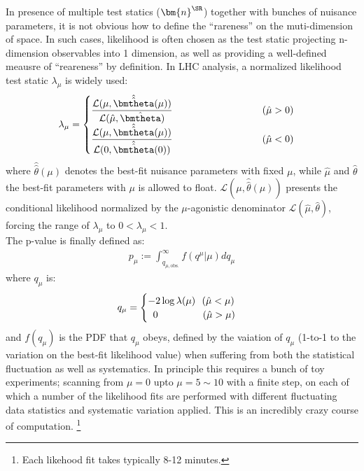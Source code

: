 In presence of multiple test statics ($\bm{n}^{\SR}$) together with bunches of nuisance parameters, it is not obvious how to define the ``rareness'' on the muti-dimension of space. In such cases, likelihood is often chosen as the test static projecting n-dimension observables into 1 dimension, as well as providing a well-defined meausre of ``reareness'' by definition. In LHC analysis, a normalized likelihood test static $\lambda_\mu$ is widely used:
\begin{align}
\lambda_\mu = 
        \begin{cases}
        \dfrac{ \mathcal{L} (\mu, \hat{\hat{\bmtheta}}(\mu)) }{ \mathcal{L} (\hat{\mu}, \hat{\bmtheta})  }         \mbox{\phantom{MMMMMMMMMM}} (\hat{\mu}>0)        \\
        \dfrac{ \mathcal{L} (\mu, \hat{\hat{\bmtheta}}(\mu)) }{ \mathcal{L} (0, \hat{\hat{\bmtheta}}(0))  }  \mbox{\phantom{MMMMMMMMMM}} (\hat{\mu}<0)
        \end{cases}
\end{align}
where $\hat{\hat{\theta}}(\mu)$ denotes the best-fit nuisance parameters with fixed $\mu$,
while $\hat{\mu}$ and $\hat{\theta}$ the best-fit parameters with $\mu$ is allowed to float. 
$\mathcal{L} (\mu, \hat{\hat{\theta}}(\mu))$ presents the conditional likelihood normalized by the $\mu$-agonistic denominator $\mathcal{L} (\hat{\mu}, \hat{\theta})$, forcing the range of $\lambda_\mu$ to $0<\lambda_\mu<1$. \\

The p-value is finally defined as:
\begin{align}
p_\mu := \int_{q_{\mu,\mathrm{obs.}}}^{\infty}  f(q^{\mu}|\mu) dq_\mu
\end{align}
where $q_{\mu}$ is:
\begin{align}
q_{\mu} = 
        \begin{cases}
        -2 \log\lambda(\mu)     \,\,\,\,  (\hat{\mu} < \mu) \\
        \mbox{\phantom{k}} 0     \mbox{\phantom{MMMMM}} (\hat{\mu} > \mu)
        \end{cases}
\end{align}
and $f(q_\mu)$ is the PDF that $q_\mu$ obeys, defined by the vaiation of $q_\mu$ (1-to-1 to the variation on the best-fit likelihood value) when suffering from both the statistical fluctuation as well as systematics.
In principle this requires a bunch of toy experiments; scanning from $\mu=0$ upto $\mu=5\sim 10$ with a finite step, on each of which a number of the likelihood fits are performed with different fluctuating data statistics and systematic variation applied. This is an incredibly crazy course of computation.
\footnote{Each likehood fit takes typically 8-12 minutes. }


